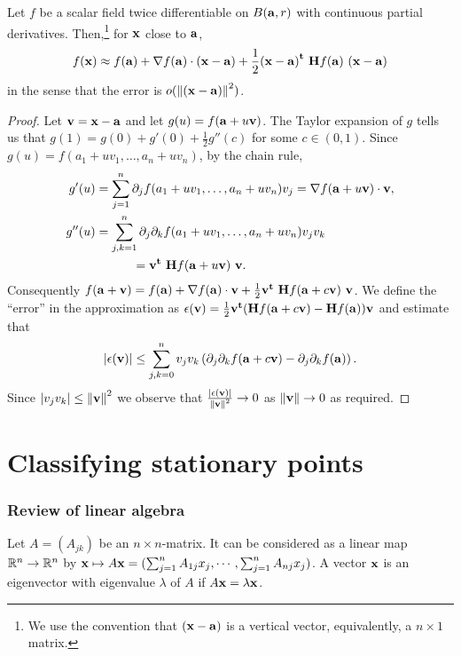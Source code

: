 \begin{theorem}
    Let \(f\) be a scalar field twice differentiable on \(B(\aa,r)\) with continuous partial derivatives.
    Then,\footnote{We use the convention that \((\xx-\aa)\) is a vertical vector, equivalently, a \(n \times 1\) matrix.} for \(\xx\) close to \(\aa\),
    \[
        f(\xx) \approx f(\aa) + \nabla f(\aa) \cdot (\xx-\aa) + \frac{1}{2} {(\xx-\aa)}^{\mathbf{t}} \ \mathbf{H} f (\aa) \ (\xx-\aa)
    \]
    in the sense that the error is \(\littleo{\norm{(\xx-\aa)}^2}\).
\end{theorem}

\begin{proof}
    Let \(\vv = \xx-\aa\) and let \(g(u) = f(\aa + u \vv)\).
    The Taylor expansion of \(g\) tells us that
    \(g(1) = g(0) + g'(0) + \frac{1}{2} g''(c)\) for some \(c\in (0,1)\).
    Since \(g(u) = f(a_1 + uv_1, \ldots, a_n + u v_n)\), by the chain rule,
    \[
        \begin{aligned}
            g'(u)  & = \sum_{j=1}^{n} \partial_j f( a_1 + uv_1, \ldots, a_n + u v_n ) v_j
            =\nabla f( \aa + u \vv) \cdot \vv,                                                            \\
            g''(u) & = \sum_{j,k=1}^{n} \partial_j\partial_k f( a_1 + uv_1, \ldots, a_n + u v_n ) v_j v_k \\
                   & \quad \quad \quad
            =  \vv^{\mathbf{t}} \ \mathbf{H} f (\aa + u \vv) \ \vv.
        \end{aligned}
    \]
    Consequently
    \(
    f(\aa+\vv) = f(\aa) + \nabla f(\aa) \cdot \vv + \frac{1}{2} \vv^{\mathbf{t}} \ \mathbf{H} f (\aa + c\vv) \ \vv
    \).
    We define the ``error'' in the approximation as \(\epsilon(\vv) = \frac{1}{2}  \vv^{\mathbf{t}} (\mathbf{H} f (\aa + c\vv) - \mathbf{H} f (\aa)  ) \vv\)
    and estimate that
    \[
        \abs{\epsilon(\vv)} \leq \sum_{j,k=0}^{n}
        v_j v_k \left( \partial_{j}\partial_{k}f(\aa+c\vv)-\partial_{j}\partial_{k}f(\aa) \right).
    \]
    Since \(\abs{ v_j v_k} \leq \norm{\vv}^2\) we observe that \(\frac{\abs{\epsilon(\vv)} }{\norm{\vv}^2} \to 0\) as \(\norm{\vv} \to 0\) as required.
\end{proof}


\section{Classifying stationary points}
\subsubsection*{Review of linear algebra}
Let $A = (A_{jk})$ be an $n\times n$-matrix. It can be considered as a linear map $\bR^n \to \bR^n$
by $\xx \mapsto A\xx = (\sum_{j=1}^n A_{1j}x_j, \cdots, \sum_{j=1}^n A_{nj} x_j)$.
A vector $\xx$ is an eigenvector with eigenvalue $\lambda$ of $A$ if $A\xx = \lambda\xx$.

